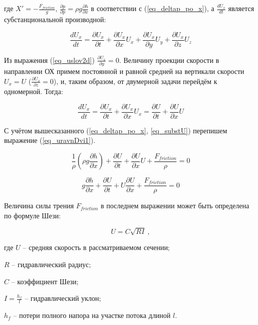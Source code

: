 \noindent где $ X' = -\frac{ F_{friction} }{g} $, $  \frac{\partial p}{\partial p} = \rho g \frac{\partial h}{\partial x} $ в соответствии с (\ref{eq_deltap_po_x}), а $ \frac{d U_x}{d t} $ является субстанциональной производной:

$$
  \displaystyle \frac{d U_x}{d t} = \frac{\partial U_x}{\partial t} + \frac{\partial U_x}{\partial x} U_x + \frac{\partial U_x}{\partial y} U_y + \frac{\partial U_x}{\partial z} U_z
$$

Из выражения (\ref{eq_uslov2d}) $ \frac{\partial U_x}{\partial y} = 0 $. Величину проекции скорости в направлении ОХ примем постоянной и равной средней на вертикали скорости $ U_x = U $ ($ \frac{\partial U_x}{\partial z} = 0 $), и, таким образом, от двумерной задачи перейдём к одномерной. Тогда:

\begin{equation}
  \label{eq_substU}
  \displaystyle \frac{d U_x}{d t} = \frac{\partial U_x}{\partial t} + \frac{\partial U_x}{\partial x} U_x = \frac{\partial U}{\partial t} + \frac{\partial U}{\partial x} U 
\end{equation}

С учётом вышесказанного (\ref{eq_deltap_po_x}, \ref{eq_substU}) перепишем выражение (\ref{eq_uravnDvi1}).

$$
  \displaystyle \frac{1}{\rho} \left( \rho g \frac{ \partial h}{ \partial x} \right) + \frac{\partial U}{\partial t} + \frac{\partial U}{\partial x} U + \frac{F_{friction}}{\rho} = 0
$$

\begin{equation}
  \label{eq_uravnDvi2}
\displaystyle g \frac{ \partial h}{ \partial x} + \frac{\partial U}{\partial t} + U \frac{\partial U}{\partial x} + \frac{F_{friction}}{\rho} = 0
\end{equation}

\vspace{1cm}

Величина силы трения $ F_{friction} $ в последнем выражении может быть определена по формуле Шези:

$$
  U = C\sqrt{RI} \ ,
$$

\noindent где $ U $ -- средняя скорость в рассматриваемом сечении; 

$ R $ -- гидравлический радиус; 

$ C $ -- коэффициент Шези; 

$ I = \frac{h_f} {l} $ -- гидравлический уклон; 

$ h_f $ -- потери полного напора на участке потока длиной $ l $. \\

